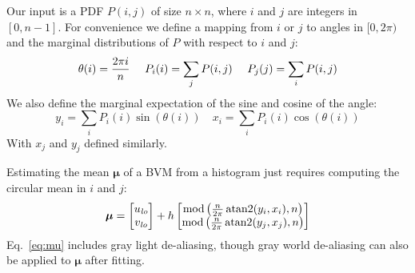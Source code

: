 \documentclass[10pt,twocolumn,letterpaper]{article}
\DeclareMathOperator{\atantwo}{atan2}
\newcommand{\binwidth}{h}
\begin{document}
Our input is a PDF $P(i,j)$ of size $n \times n$,
where $i$ and $j$ are integers in $[0, n-1]$.
For convenience we define a mapping from $i$ or $j$ to angles in $[ 0, 2\pi )$
and the marginal distributions of $P$ with respect to $i$ and $j$:
\begin{equation}
\theta(i) = {2\pi i \over n} \quad\,\, P_i(i) = \sum_j P(i, j) \quad\,\, P_j(j) = \sum_i P(i, j) \nonumber
\end{equation}
We also define the marginal expectation of the sine and cosine of the angle:
\begin{equation}
y_i = \sum_i P_i(i) \sin(\theta(i)) \quad x_i = \sum_i P_i(i) \cos(\theta(i))
\end{equation}
With $x_j$ and $y_j$ defined similarly.

Estimating the mean $\boldsymbol \mu$ of a BVM from a histogram just requires
computing the circular mean in $i$ and $j$:
\begin{equation}
\boldsymbol{\mu} = \begin{bmatrix}u_\mathit{lo} \\ v_\mathit{lo}\end{bmatrix} + \binwidth\begin{bmatrix}
\operatorname{mod}\left( {n \over 2\pi} \atantwo (y_i, x_i), n \right) \\
\operatorname{mod}\left( {n \over 2\pi} \atantwo (y_j, x_j), n \right) \\
\end{bmatrix} \label{eq:mu}
\end{equation}
Eq.~\ref{eq:mu} includes gray light de-aliasing, though gray world de-aliasing can also
be applied to $\boldsymbol{\mu}$ after fitting.

\newcommand{\ishift}{\bar{i}}
\newcommand{\jshift}{\bar{j}}
\end{document}
